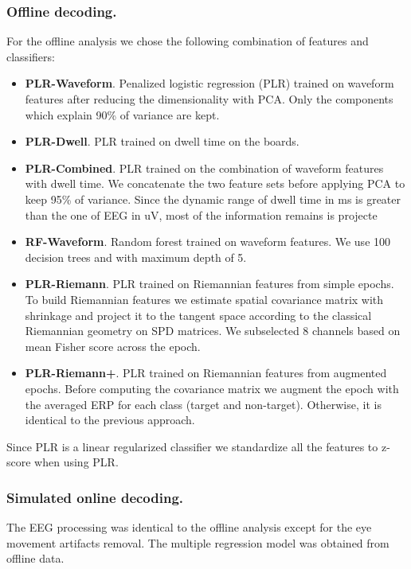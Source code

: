 \documentclass[12pt]{iopart}
\begin{document}
\subsubsection*{Offline decoding.}
For the offline analysis we chose the following combination of features and classifiers:
\begin{itemize}
    \item \textbf{PLR-Waveform}. Penalized logistic regression (PLR) trained on waveform features after reducing
        the dimensionality with PCA. Only the components which explain 90\% of variance
        are kept. 
    \item \textbf{PLR-Dwell}. PLR trained on dwell time on the boards.
    \item \textbf{PLR-Combined}. PLR trained on the combination of waveform features with dwell time. We concatenate
        the two feature sets before applying PCA to keep 95\% of variance. Since the dynamic
        range of dwell time in ms is greater than the one of EEG in uV, most of the information
        remains is projecte
    \item \textbf{RF-Waveform}. Random forest trained on waveform features. We use 100 decision trees and
        with maximum depth of 5.
    \item \textbf{PLR-Riemann}. PLR trained on Riemannian features from simple epochs.
        To build Riemannian features we
        estimate spatial covariance matrix with shrinkage and project it
        to the tangent space according to the classical Riemannian geometry on SPD matrices.
        We subselected 8 channels based on mean Fisher score across the epoch.
    \item \textbf{PLR-Riemann+}. PLR trained on Riemannian features from augmented epochs.
        Before computing the covariance matrix we augment the epoch with the averaged ERP
        for each class (target and non-target). Otherwise, it is identical to the previous
        approach.
\end{itemize}

Since PLR is a linear regularized classifier we standardize all the features to z-score when
using PLR.

\subsubsection*{Simulated online decoding.}
The EEG processing was identical to the offline analysis
except for the eye movement artifacts removal. The multiple regression
model was obtained from offline data.
\end{document}
